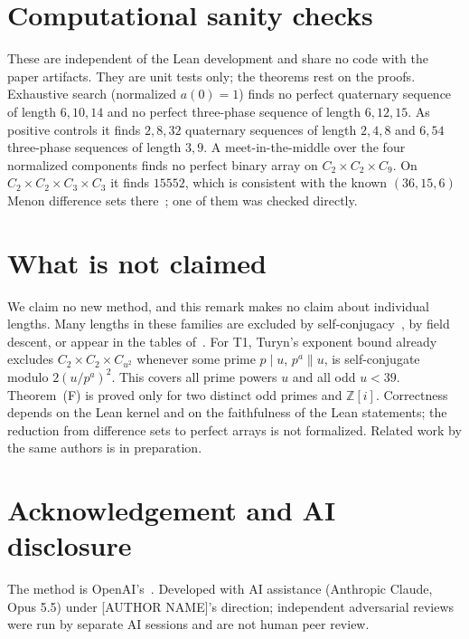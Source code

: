 \documentclass[11pt]{amsart}
\theoremstyle{remark}
\newcommand{\Z}{\mathbb{Z}}
\begin{document}
\section{Computational sanity checks}
These are independent of the Lean development and share no code with the paper artifacts.
They are unit tests only; the theorems rest on the proofs.
Exhaustive search (normalized $a(0)=1$) finds no perfect quaternary sequence
of length $6,10,14$ and no perfect three-phase sequence of length $6,12,15$. As
positive controls it finds $2,8,32$ quaternary sequences of length $2,4,8$ and $6,54$
three-phase sequences of length $3,9$. A meet-in-the-middle over the four
normalized components finds no perfect binary array on $C_2\times C_2\times C_9$. On
$C_2\times C_2\times C_3\times C_3$ it finds $15552$, which is consistent with the known
$(36,15,6)$ Menon difference sets there~\cite{Menon}; one of them was checked directly.

\section{What is not claimed}
We claim no new method, and this remark makes no claim about individual lengths. Many lengths in
these families are excluded by self-conjugacy~\cite{Turyn,ADM,MaNg}, by field descent, or appear in
the tables of~\cite{Arasu}. For T1, Turyn's exponent bound already excludes
$C_2\times C_2\times C_{u^2}$ whenever some prime $p\mid u$, $p^a\parallel u$, is self-conjugate
modulo $2(u/p^a)^2$. This covers all prime powers $u$ and all odd $u<39$. Theorem~(F) is proved only for two
distinct odd primes and $\Z[i]$. Correctness depends on the Lean kernel and on the
faithfulness of the Lean statements; the reduction from difference sets to perfect arrays is not formalized.
Related work by the same authors is in preparation.

\section*{Acknowledgement and AI disclosure}
The method is OpenAI's~\cite{OAI179}. Developed with AI assistance (Anthropic Claude,
Opus 5.5) under [AUTHOR NAME]'s direction; independent adversarial reviews were run
by separate AI sessions and are not human peer review.
\end{document}
